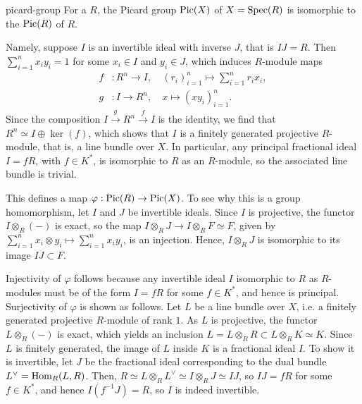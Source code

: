 \begin{example}{picard-group}
    For a  $R$, the Picard group $\textup{Pic}(X)$ of $X = \operatorname{Spec}(R)$ is isomorphic to the  $\textup{Pic}(R)$ of $R$.
    
    Namely, suppose $I$ is an invertible ideal with inverse $J$, that is $IJ = R$. Then $\sum_{i = 1}^{n} x_i y_i = 1$ for some $x_i \in I$ and $y_i \in J$, which induces $R$-module maps
    \[ \begin{aligned}
        f &: R^n \to I, \quad (r_i)_{i = 1}^{n} \mapsto \sum_{i = 1}^{n} r_i x_i , \\
        g &: I \to R^n, \quad x \mapsto (x y_i)_{i = 1}^{n} .
    \end{aligned} \]
    Since the composition $I \xrightarrow{g} R^n \xrightarrow{f} I$ is the identity, we find that $R^n \simeq I \oplus \ker(f)$, which shows that $I$ is a finitely generated projective $R$-module, that is, a line bundle over $X$. In particular, any principal fractional ideal $I = fR$, with $f \in K^*$, is isomorphic to $R$ as an $R$-module, so the associated line bundle is trivial.
    
    This defines a map $\varphi : \textup{Pic}(R) \to \textup{Pic}(X)$. To see why this is a group homomorphism, let $I$ and $J$ be invertible ideals. Since $I$ is projective, the functor $I \otimes_R (-)$ is exact, so the map $I \otimes_R J \to I \otimes_R F \simeq F$, given by $\sum_{i = 1}^{n} x_i \otimes y_i \mapsto \sum_{i = 1}^{n} x_i y_i$, is an injection. Hence, $I \otimes_R J$ is isomorphic to its image $IJ \subset F$.
    
    Injectivity of $\varphi$ follows because any invertible ideal $I$ isomorphic to $R$ as $R$-modules must be of the form $I = fR$ for some $f \in K^*$, and hence is principal. Surjectivity of $\varphi$ is shown as follows. Let $L$ be a line bundle over $X$, i.e. a finitely generated projective $R$-module of rank $1$. As $L$ is projective, the functor $L \otimes_R (-)$ is exact, which yields an inclusion $L = L \otimes_R R \subset L \otimes_R K \simeq K$. Since $L$ is finitely generated, the image of $L$ inside $K$ is a fractional ideal $I$. To show it is invertible, let $J$ be the fractional ideal corresponding to the dual bundle $L^\vee = \text{Hom}_R(L, R)$. Then, $R \simeq L \otimes_R L^\vee \simeq I \otimes_R J \simeq IJ$, so $IJ = fR$ for some $f \in K^*$, and hence $I (f^{-1} J) = R$, so $I$ is indeed invertible.
\end{example}

